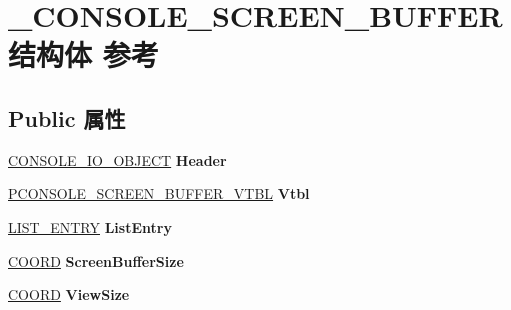 \hypertarget{struct___c_o_n_s_o_l_e___s_c_r_e_e_n___b_u_f_f_e_r}{}\section{\+\_\+\+C\+O\+N\+S\+O\+L\+E\+\_\+\+S\+C\+R\+E\+E\+N\+\_\+\+B\+U\+F\+F\+E\+R结构体 参考}
\label{struct___c_o_n_s_o_l_e___s_c_r_e_e_n___b_u_f_f_e_r}
\subsection*{Public 属性}
\begin{DoxyCompactItemize}
\item 
\mbox{\label{struct___c_o_n_s_o_l_e___s_c_r_e_e_n___b_u_f_f_e_r_a6e77a28fbb5a93561eed6c1f805d2212}} 
\hyperlink{struct___c_o_n_s_o_l_e___i_o___o_b_j_e_c_t}{C\+O\+N\+S\+O\+L\+E\+\_\+\+I\+O\+\_\+\+O\+B\+J\+E\+CT} {\bfseries Header}
\item 
\mbox{\label{struct___c_o_n_s_o_l_e___s_c_r_e_e_n___b_u_f_f_e_r_aa207fc7e98249d8f38af6d990b4b7d0c}} 
\hyperlink{struct___c_o_n_s_o_l_e___s_c_r_e_e_n___b_u_f_f_e_r___v_t_b_l}{P\+C\+O\+N\+S\+O\+L\+E\+\_\+\+S\+C\+R\+E\+E\+N\+\_\+\+B\+U\+F\+F\+E\+R\+\_\+\+V\+T\+BL} {\bfseries Vtbl}
\item 
\mbox{\label{struct___c_o_n_s_o_l_e___s_c_r_e_e_n___b_u_f_f_e_r_af962ecddec03f101c360075c95a0fc8c}} 
\hyperlink{struct___l_i_s_t___e_n_t_r_y}{L\+I\+S\+T\+\_\+\+E\+N\+T\+RY} {\bfseries List\+Entry}
\item 
\mbox{\label{struct___c_o_n_s_o_l_e___s_c_r_e_e_n___b_u_f_f_e_r_aaf466c60ae53bb2add5e645bb1cc6038}} 
\hyperlink{struct___c_o_o_r_d}{C\+O\+O\+RD} {\bfseries Screen\+Buffer\+Size}
\item 
\mbox{\label{struct___c_o_n_s_o_l_e___s_c_r_e_e_n___b_u_f_f_e_r_afb60aa62f8d479e868c32f51fca2da3b}} 
\hyperlink{struct___c_o_o_r_d}{C\+O\+O\+RD} {\bfseries View\+Size}
\item 

\end{DoxyCompactItemize}
